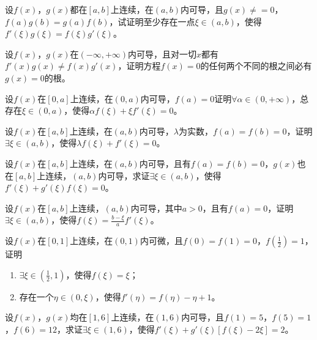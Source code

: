 \begin{example}
	设$f(x)$，$g(x)$都在$[a,b]$上连续，在$(a,b)$内可导，且$g(x)\neq=0$，$f(a)g(b)=g(a)f(b)$，试证明至少存在一点$\xi\in(a,b)$，使得$f'(\xi)g(\xi)=f(\xi)g'(\xi)$。
\end{example}

\begin{example}
	设$f(x)$，$g(x)$在$(-\infty,+\infty)$内可导，且对一切$x$都有$f'(x)g(x)\neq f(x)g'(x)$，证明方程$f(x)=0$的任何两个不同的根之间必有$g(x)=0$的根。
\end{example}

\begin{example}
	设$f(x)$在$[0,a]$上连续，在$(0,a)$内可导，$f(a)=0$证明$\forall\alpha\in(0,+\infty)$，总存在$\xi\in(0,a)$，使得$\alpha f(\xi)+\xi f'(\xi)=0$。
\end{example}

\begin{example}
	设$f(x)$在$[a,b]$上连续，在$(a,b)$内可导，$\lambda$为实数，$f(a)=f(b)=0$，证明$\exists\xi\in(a,b)$，使得$\lambda f(\xi)+f'(\xi)=0$。
\end{example}

\begin{example}
	设$f(x)$在$[a,b]$上连续，在$(a,b)$内可导，且有$f(a)=f(b)=0$，$g(x)$也在$[a,b]$上连续，$(a,b)$内可导，求证$\exists\xi\in(a,b)$，使得$f'(\xi)+g'(\xi)f(\xi)=0$。
\end{example}

\begin{example}
	设$f(x)$在$[a,b]$上连续，$(a,b)$内可导，其中$a>0$，且有$f(a)=0$，证明$\exists\xi\in(a,b)$，使得$f(\xi)=\frac{b-\xi}{a}f'(\xi)$。
\end{example}

\begin{example}
	设$f(x)$在$[0,1]$上连续，在$(0,1)$内可微，且$f(0)=f(1)=0$，$f(\frac{1}{2})=1$，证明
	\begin{enumerate}
		\item $\exists\xi\in(\frac{1}{2},1)$，使得$f(\xi)=\xi$；
		\item 存在一个$\eta\in(0,\xi)$，使得$f'(\eta)=f(\eta)-\eta+1$。
	\end{enumerate}
\end{example}

\begin{example}
	设$f(x)$，$g(x)$均在$[1,6]$上连续，在$(1,6)$内可导，且$f(1)=5$，$f(5)=1$，$f(6)=12$，求证$\exists\xi\in(1,6)$，使得$f'(\xi)+g'(\xi)[f(\xi)-2\xi]=2$。
\end{example}

